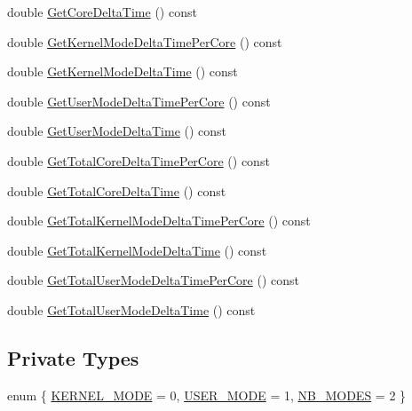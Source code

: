 \begin{DoxyCompactItemize}
\item 
double \hyperlink{classmage_1_1_c_p_u_timer_abb3526d1aca4511e1f6f7cfec53bf15a}{Get\+Core\+Delta\+Time} () const
\item 
double \hyperlink{classmage_1_1_c_p_u_timer_ae69c9126851135ec5d0eda930ace3999}{Get\+Kernel\+Mode\+Delta\+Time\+Per\+Core} () const
\item 
double \hyperlink{classmage_1_1_c_p_u_timer_a6bb5464996283d8ff2161cc683e8c0d1}{Get\+Kernel\+Mode\+Delta\+Time} () const
\item 
double \hyperlink{classmage_1_1_c_p_u_timer_af6f972b523d00a83d5360f61bf0a1e50}{Get\+User\+Mode\+Delta\+Time\+Per\+Core} () const
\item 
double \hyperlink{classmage_1_1_c_p_u_timer_a999022706e5fa8ff4ee8c25de4be0e81}{Get\+User\+Mode\+Delta\+Time} () const
\item 
double \hyperlink{classmage_1_1_c_p_u_timer_af501e54e834f68469dd4a0f128f2da79}{Get\+Total\+Core\+Delta\+Time\+Per\+Core} () const
\item 
double \hyperlink{classmage_1_1_c_p_u_timer_a5fb59355f6c747be98bfb4d924a0a0ec}{Get\+Total\+Core\+Delta\+Time} () const
\item 
double \hyperlink{classmage_1_1_c_p_u_timer_abe27bc40d9e61bdf97755706b4be238c}{Get\+Total\+Kernel\+Mode\+Delta\+Time\+Per\+Core} () const
\item 
double \hyperlink{classmage_1_1_c_p_u_timer_aa9a1db98ad3d46674c733256dedff164}{Get\+Total\+Kernel\+Mode\+Delta\+Time} () const
\item 
double \hyperlink{classmage_1_1_c_p_u_timer_a72bf36dbc5a67f99251125aa6e5c19f6}{Get\+Total\+User\+Mode\+Delta\+Time\+Per\+Core} () const
\item 
double \hyperlink{classmage_1_1_c_p_u_timer_a098c9ecc1f84918970b4644f0ba8bfc4}{Get\+Total\+User\+Mode\+Delta\+Time} () const
\end{DoxyCompactItemize}
\subsection*{Private Types}
\begin{DoxyCompactItemize}
\item 
enum \{ \hyperlink{classmage_1_1_c_p_u_timer_a17f6aa71c97aef46fea51190709e4c14ae1a0a7748289875873f8a9948c2234e0}{K\+E\+R\+N\+E\+L\+\_\+\+M\+O\+DE} = 0, 
\hyperlink{classmage_1_1_c_p_u_timer_a17f6aa71c97aef46fea51190709e4c14ad5bce4c910796ef2ef4323a0153a2add}{U\+S\+E\+R\+\_\+\+M\+O\+DE} = 1, 
\hyperlink{classmage_1_1_c_p_u_timer_a17f6aa71c97aef46fea51190709e4c14ab63e6023ec0bea89568ebb2b98728b77}{N\+B\+\_\+\+M\+O\+D\+ES} = 2
 \}
\end{DoxyCompactItemize}
